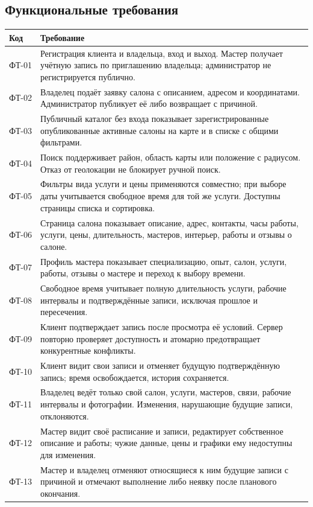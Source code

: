 \subsection{Функциональные требования}
\begin{longtable}{L{1.6cm}L{13.2cm}}
\toprule Код & Требование \\ \midrule
\endhead
ФТ-01 & Регистрация клиента и владельца, вход и выход. Мастер получает учётную запись по приглашению владельца; администратор не регистрируется публично. \\
ФТ-02 & Владелец подаёт заявку салона с описанием, адресом и координатами. Администратор публикует её либо возвращает с причиной. \\
ФТ-03 & Публичный каталог без входа показывает зарегистрированные опубликованные активные салоны на карте и в списке с общими фильтрами. \\
ФТ-04 & Поиск поддерживает район, область карты или положение с радиусом. Отказ от геолокации не блокирует ручной поиск. \\
ФТ-05 & Фильтры вида услуги и цены применяются совместно; при выборе даты учитывается свободное время для той же услуги. Доступны страницы списка и сортировка. \\
ФТ-06 & Страница салона показывает описание, адрес, контакты, часы работы, услуги, цены, длительность, мастеров, интерьер, работы и отзывы о салоне. \\
ФТ-07 & Профиль мастера показывает специализацию, опыт, салон, услуги, работы, отзывы о мастере и переход к выбору времени. \\
ФТ-08 & Свободное время учитывает полную длительность услуги, рабочие интервалы и подтверждённые записи, исключая прошлое и пересечения. \\
ФТ-09 & Клиент подтверждает запись после просмотра её условий. Сервер повторно проверяет доступность и атомарно предотвращает конкурентные конфликты. \\
ФТ-10 & Клиент видит свои записи и отменяет будущую подтверждённую запись; время освобождается, история сохраняется. \\
ФТ-11 & Владелец ведёт только свой салон, услуги, мастеров, связи, рабочие интервалы и фотографии. Изменения, нарушающие будущие записи, отклоняются. \\
ФТ-12 & Мастер видит своё расписание и записи, редактирует собственное описание и работы; чужие данные, цены и графики ему недоступны для изменения. \\
ФТ-13 & Мастер и владелец отменяют относящиеся к ним будущие записи с причиной и отмечают выполнение либо неявку после планового окончания. \\

\end{longtable}
